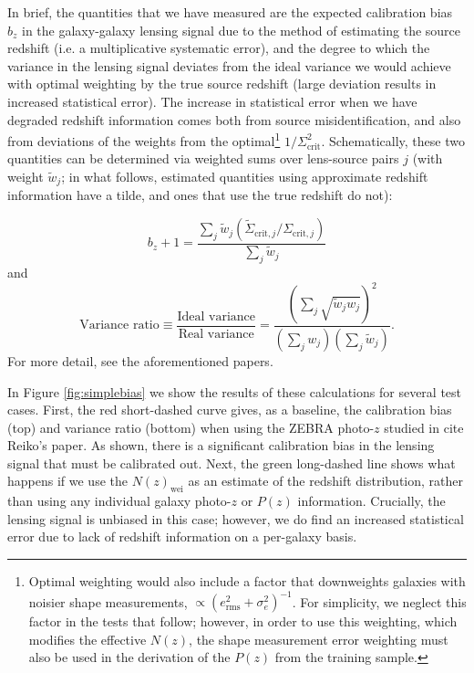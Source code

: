 \documentclass[preprint]{aastex}
\begin{document}
In brief, the quantities that we have measured are the expected calibration
bias $b_z$ in the galaxy-galaxy lensing signal due to the method of estimating
the source redshift (i.e. a multiplicative systematic error), and the degree to
which the variance in the lensing signal deviates from the ideal variance we
would achieve with optimal weighting by the true source redshift (large
deviation results in increased statistical error).  The increase in statistical
error when we have degraded redshift information comes both from source
misidentification, and also from deviations of the weights from the
optimal\footnote{Optimal weighting would also include a factor that downweights
galaxies with noisier shape measurements, $\propto (e_\mathrm{rms}^2 +
\sigma_e^2)^{-1}$.  For simplicity, we neglect this factor in the tests that
follow; however, in order to use this weighting, which modifies the effective
$N(z)$, the shape measurement error weighting must also be used in the
derivation of the $P(z)$ from the training sample.} $1/\Sigma_\mathrm{crit}^2$.
Schematically, these two quantities can be determined via weighted sums over
lens-source pairs $j$ (with weight $\tilde{w}_j$; in what follows, estimated
quantities using approximate redshift information have a tilde, and ones that
use the true redshift do not):

\noindent
\begin{equation} \label{eq:lensbias}
b_z + 1 = \frac{\sum_j \tilde{w}_j (\tilde{\Sigma}_{\mathrm{crit},j}
   / \Sigma_{\mathrm{crit},j})}{\sum_j \tilde{w}_j}
\end{equation}
and
\begin{equation} \label{eq:lensweight}
\textrm{Variance ratio}  \equiv \frac{\textrm{Ideal variance}}{\textrm{Real
     variance}} = \frac{(\sum_j \sqrt{\tilde{w}_j w_j})^2}{(\sum_j
     w_j)(\sum_j \tilde{w}_j)}.
\end{equation}
For more detail, see the aforementioned papers.

In Figure \ref{fig:simplebias} we show the results of these calculations for
several test cases.  First, the red short-dashed curve gives, as a baseline,
the calibration bias (top) and variance ratio (bottom) when using the ZEBRA
photo-$z$ studied in {\color{red} cite Reiko's paper}.  As shown, there is a
significant calibration bias in the lensing signal that must be calibrated out.
Next, the green long-dashed line shows what happens if we use the
$N(z)_\mathrm{wei}$ as an estimate of the redshift distribution, rather than
using any individual galaxy photo-$z$ or $P(z)$ information.  Crucially, the
lensing signal is unbiased in this case; however, we do find an increased
statistical error due to lack of redshift information on a per-galaxy basis.
\end{document}
